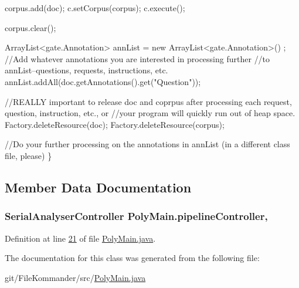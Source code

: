 \begin{DoxyCode}
        corpus.add(doc);
        c.setCorpus(corpus);
        c.execute();
        
        corpus.clear();
        
          ArrayList<gate.Annotation> annList = \textcolor{keyword}{new} ArrayList<gate.Annotation>()
      ;
          \textcolor{comment}{//Add whatever annotations you are interested in processing further}
          \textcolor{comment}{//to annList--questions, requests, instructions, etc.}
          annList.addAll(doc.getAnnotations().get(\textcolor{stringliteral}{"Question"}));
         
        
         
\textcolor{comment}{//REALLY important to release doc and coprpus after processing each request,
       question, instruction, etc., or }
\textcolor{comment}{//your program will quickly run out of heap space.       }
              Factory.deleteResource(doc);
              Factory.deleteResource(corpus);
              
            \textcolor{comment}{//Do your further processing on the annotations in annList (in a
       different class file, please)   }
    \}
\end{DoxyCode}


\subsection{Member Data Documentation}
\hypertarget{class_poly_main_a0c7824b053777ab5d9cb8ee2f3d8a276}{
\subsubsection[{pipeline\-Controller}]{\setlength{\rightskip}{0pt plus 5cm}Serial\-Analyser\-Controller Poly\-Main.\-pipeline\-Controller\hspace{0.3cm}{\ttfamily [static]}, {\ttfamily [private]}}}\label{class_poly_main_a0c7824b053777ab5d9cb8ee2f3d8a276}


Definition at line \hyperlink{L21}{21} of file \hyperlink{}{Poly\-Main.\-java}.



The documentation for this class was generated from the following file\-:\begin{DoxyCompactItemize}
\item 
git/\-File\-Kommander/src/\hyperlink{_poly_main_8java}{Poly\-Main.\-java}\end{DoxyCompactItemize}
